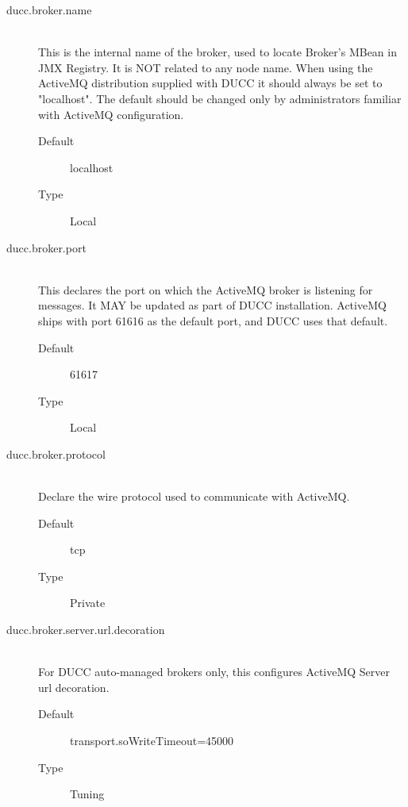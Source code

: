 \begin{description}
       \item[ducc.broker.name] \hfill \\
         This is the internal name of the broker, used to locate Broker's MBean in JMX Registry. 
         It is NOT related to any node name. When using the ActiveMQ distribution supplied with 
         DUCC it should always be set to "localhost".  The default should be changed only by
         administrators familiar with ActiveMQ configuration.
         \begin{description}
           \item[Default] localhost 
           \item[Type] Local              
         \end{description}


       \item[ducc.broker.port] \hfill \\
         This declares the port on which the ActiveMQ broker is listening for
         messages. It MAY be updated as part of DUCC installation. ActiveMQ ships with port
         61616 as the default port, and DUCC uses that default.         
         \begin{description}
           \item[Default] 61617              
           \item[Type] Local 
         \end{description}
             

       \item[ducc.broker.protocol] \hfill \\
         Declare the wire protocol used to communicate with ActiveMQ. 
         \begin{description}
           \item[Default] tcp 
           \item[Type] Private 
         \end{description}


       \item[ducc.broker.server.url.decoration] \hfill \\
         For DUCC auto-managed brokers only, this configures ActiveMQ Server url decoration.
         
         \begin{description}
           \item[Default] transport.soWriteTimeout=45000
           \item[Type] Tuning
         \end{description} 


\end{description}
